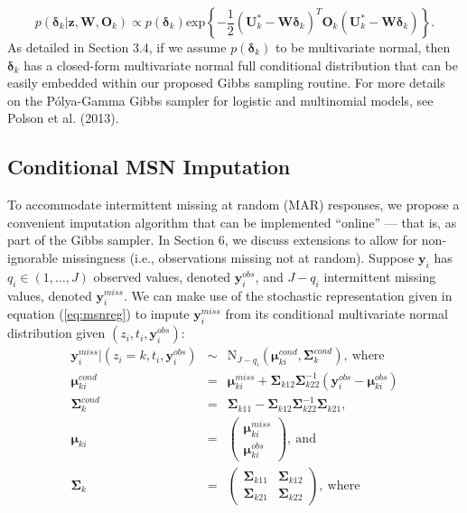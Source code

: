 \documentclass[useAMS,referee]{biom}
\begin{document}
\begin{equation}
	p(\boldsymbol\delta_k|\mathbf{z},\mathbf{W}, \mathbf{O}_k) \propto p(\boldsymbol\delta_k) \text{exp} \left \{ - \frac{1}{2} (\mathbf{U}^*_k - \mathbf{W}\boldsymbol\delta_k)^T \mathbf{O}_k (\mathbf{U}^*_k - \mathbf{W}\boldsymbol\delta_k)\right \}.
\end{equation}
As detailed in Section 3.4, if we assume $p(\boldsymbol\delta_k)$ to be multivariate normal, then $\boldsymbol\delta_k$ has a closed-form multivariate normal full conditional distribution that can be easily embedded within our proposed Gibbs sampling routine.  For more details on the P\'olya-Gamma Gibbs sampler for logistic and multinomial models, see Polson et al. (2013).
\subsection{Conditional MSN Imputation}
To accommodate intermittent missing at random (MAR) responses, we propose a convenient imputation algorithm that can be implemented ``online'' --- that is, as part of the Gibbs sampler. In Section 6, we discuss extensions to allow for non-ignorable missingness (i.e., observations missing not at random). Suppose $\mathbf{y}_i$ has $q_i\in (1,\ldots,J)$ observed values, denoted $\mathbf{y}^{obs}_i$, and $J-q_i$ intermittent missing values, denoted $\mathbf{y}^{miss}_i$. We can make use of the stochastic representation given in equation (\ref{eq:msnreg}) to impute $\mathbf{y}^{miss}_i$ from its conditional multivariate normal distribution given $(z_i,t_i,\mathbf{y}^{obs}_i)$:
\begin{eqnarray}
\mathbf{y}^{miss}_i|(z_i=k,t_i,\mathbf{y}^{obs}_i)&\sim& \text{N}_{J-q_i}(\boldsymbol\mu^{cond}_{ki},\boldsymbol\Sigma^{cond}_k),~\text{where}\nonumber\\
\boldsymbol\mu^{cond}_{ki}&=& \boldsymbol\mu^{miss}_{ki} + \boldsymbol\Sigma_{k12} \boldsymbol\Sigma_{k22}^{-1}(\mathbf{y}^{obs}_i - \boldsymbol\mu^{obs}_{ki}) \nonumber \\
\boldsymbol\Sigma^{cond}_k&=& \boldsymbol\Sigma_{k11} - \boldsymbol\Sigma_{k12}\boldsymbol\Sigma_{k22}^{-1}\boldsymbol\Sigma_{k21}, \label{eq:impute} \\
\boldsymbol\mu_{ki} &=& \begin{pmatrix} \boldsymbol\mu_{ki}^{miss} \\ \boldsymbol\mu_{ki}^{obs} \end{pmatrix}, \ \text{and} \nonumber \\
\boldsymbol\Sigma_k &=& \begin{pmatrix} 
	\boldsymbol\Sigma_{k11} & \boldsymbol\Sigma_{k12}\\
	\boldsymbol\Sigma_{k21} & \boldsymbol\Sigma_{k22}
\end{pmatrix}, \ \text{where} \nonumber
\end{eqnarray}
\end{document}
